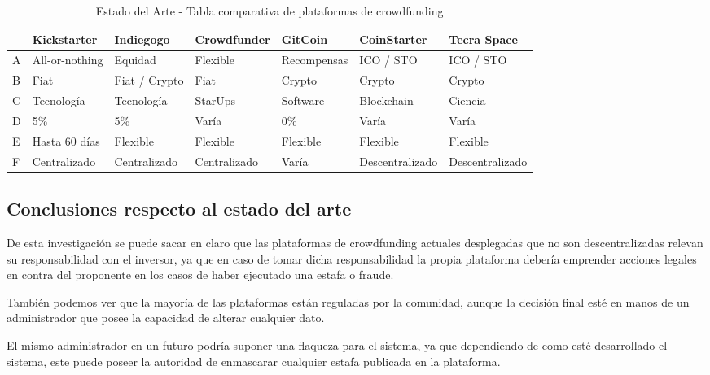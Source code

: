 \begin{table}[ht]
\centering
\begin{tabular}{@{}lllllll@{}}
\hline
    & \textbf{Kickstarter} & \textbf{Indiegogo} & \textbf{Crowdfunder} & \textbf{GitCoin} & \textbf{CoinStarter} & \textbf{Tecra Space} \\ \hline
    A & All-or-nothing & Equidad & Flexible & Recompensas & ICO / STO & ICO / STO \\
    B & Fiat & Fiat / Crypto & Fiat & Crypto & Crypto & Crypto \\
    C & Tecnología & Tecnología & StarUps & Software & Blockchain & Ciencia \\
    D & 5\% & 5\% & Varía & 0\% & Varía & Varía \\
    E & Hasta 60 días & Flexible & Flexible & Flexible & Flexible & Flexible \\
    F & Centralizado & Centralizado & Centralizado & Varía & Descentralizado & Descentralizado \\
\hline
\end{tabular}
\caption{Estado del Arte - Tabla comparativa de plataformas de crowdfunding}
\label{tab:comparativa}
\end{table}


\newpage

\subsection{Conclusiones respecto al estado del arte}

De esta investigación se puede sacar en claro que las plataformas de crowdfunding actuales desplegadas que no son descentralizadas relevan su responsabilidad con el inversor, ya que en caso de tomar dicha responsabilidad la propia plataforma debería emprender acciones legales en contra del proponente en los casos de haber ejecutado una estafa o fraude.\cite{1}

\bigskip

También podemos ver que la mayoría de las plataformas están reguladas por la comunidad, aunque la decisión final esté en manos de un administrador que posee la capacidad de alterar cualquier dato.

\bigskip

El mismo administrador en un futuro podría suponer una flaqueza para el sistema, ya que dependiendo de como esté desarrollado el sistema, este puede poseer la autoridad de enmascarar cualquier estafa publicada en la plataforma.

